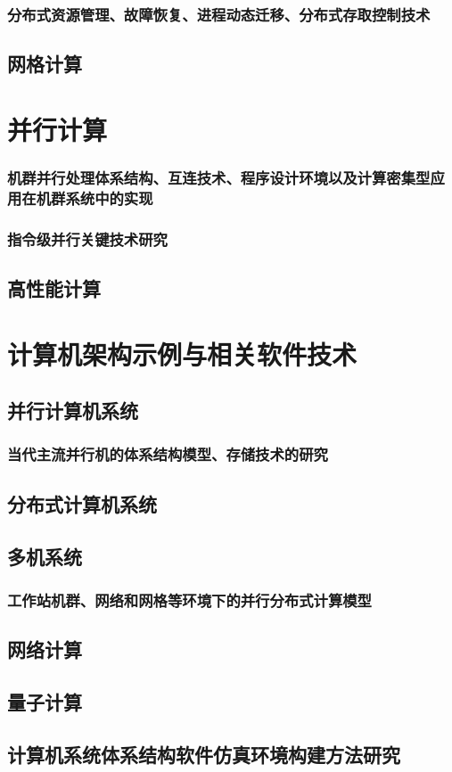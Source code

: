 \documentclass[UTF8]{../computerUniverse}
\begin{document}
\subsection{分布式资源管理、故障恢复、进程动态迁移、分布式存取控制技术}
\section{网格计算}


\chapter{并行计算}
\subsection{机群并行处理体系结构、互连技术、程序设计环境以及计算密集型应用在机群系统中的实现}
\subsection{指令级并行关键技术研究}
\section{高性能计算}



\chapter{计算机架构示例与相关软件技术}

\section{并行计算机系统}
\subsection{当代主流并行机的体系结构模型、存储技术的研究}

\section{分布式计算机系统}

\section{多机系统}
\subsection{工作站机群、网络和网格等环境下的并行分布式计算模型}

\section{网络计算}

\section{量子计算}


\section{计算机系统体系结构软件仿真环境构建方法研究}
\end{document}
